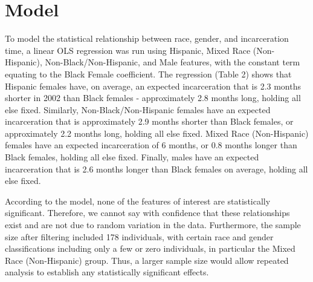 \documentclass[12pt]{article}
\begin{document}
\section*{Model}
To model the statistical relationship between race, gender, and incarceration time, a linear OLS regression was run using Hispanic, Mixed Race (Non-Hispanic), Non-Black/Non-Hispanic, and Male features, with the constant term equating to the Black Female coefficient. The regression (Table 2) shows that Hispanic females have, on average, an expected incarceration that is 2.3 months shorter in 2002 than Black females - approximately 2.8 months long, holding all else fixed. Similarly, Non-Black/Non-Hispanic females have an expected incarceration that is approximately 2.9 months shorter than Black females, or approximately 2.2 months long, holding all else fixed. Mixed Race (Non-Hispanic) females have an expected incarceration of 6 months, or 0.8 months longer than Black females, holding all else fixed. Finally, males have an expected incarceration that is 2.6 months longer than Black females on average, holding all else fixed. 

According to the model, none of the features of interest are statistically significant. Therefore, we cannot say with confidence that these relationships exist and are not due to random variation in the data. Furthermore, the sample size after filtering included 178 individuals, with certain race and gender classifications including only a few or zero individuals, in particular the Mixed Race (Non-Hispanic) group. Thus, a larger sample size would allow repeated analysis to establish any statistically significant effects. 

\begin{table}[H]

\end{table}
\end{document}
